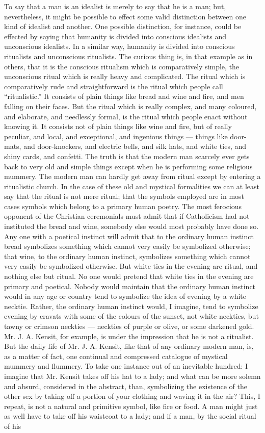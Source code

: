 To say that a man is an idealist is merely to say that he is a man; but, nevertheless, it might be possible to effect some valid distinction between one kind of idealist and another. One possible distinction, for instance, could be effected by saying that humanity is divided into conscious idealists and unconscious idealists. In a similar way, humanity is divided into conscious ritualists and unconscious ritualists. The curious thing is, in that example as in others, that it is the conscious ritualism which is comparatively simple, the unconscious ritual which is really heavy and complicated. The ritual which is comparatively rude and straightforward is the ritual which people call “ritualistic.” It consists of plain things like bread and wine and fire, and men falling on their faces. But the ritual which is really complex, and many coloured, and elaborate, and needlessly formal, is the ritual which people enact without knowing it. It consists not of plain things like wine and fire, but of really peculiar, and local, and exceptional, and ingenious things — things like door-mats, and door-knockers, and electric bells, and silk hats, and white ties, and shiny cards, and confetti. The truth is that the modern man scarcely ever gets back to very old and simple things except when he is performing some religious mummery. The modern man can hardly get away from ritual except by entering a ritualistic church. In the case of these old and mystical formalities we can at least say that the ritual is not mere ritual; that the symbols employed are in most cases symbols which belong to a primary human poetry. The most ferocious opponent of the Christian ceremonials must admit that if Catholicism had not instituted the bread and wine, somebody else would most probably have done so. Any one with a poetical instinct will admit that to the ordinary human instinct bread symbolizes something which cannot very easily be symbolized otherwise; that wine, to the ordinary human instinct, symbolizes something which cannot very easily be symbolized otherwise. But white ties in the evening are ritual, and nothing else but ritual. No one would pretend that white ties in the evening are primary and poetical. Nobody would maintain that the ordinary human instinct would in any age or country tend to symbolize the idea of evening by a white necktie. Rather, the ordinary human instinct would, I imagine, tend to symbolize evening by cravats with some of the colours of the sunset, not white neckties, but tawny or crimson neckties — neckties of purple or olive, or some darkened gold. Mr. J. A. Kensit, for example, is under the impression that he is not a ritualist. But the daily life of Mr. J. A. Kensit, like that of any ordinary modern man, is, as a matter of fact, one continual and compressed catalogue of mystical mummery and flummery. To take one instance out of an inevitable hundred: I imagine that Mr. Kensit takes off his hat to a lady; and what can be more solemn and absurd, considered in the abstract, than, symbolizing the existence of the other sex by taking off a portion of your clothing and waving it in the air? This, I repeat, is not a natural and primitive symbol, like fire or food. A man might just as well have to take off his waistcoat to a lady; and if a man, by the social ritual of his 